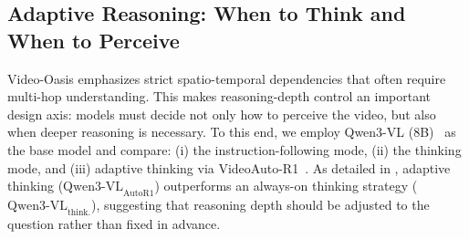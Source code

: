 \documentclass[runningheads]{llncs}
\begin{document}
{    \vspace{-4mm}

    \subsection{Adaptive Reasoning: When to Think and When to Perceive}
    \label{sec:5.2}
        Video-Oasis emphasizes strict spatio-temporal dependencies that often require multi-hop understanding.
        This makes reasoning-depth control an important design axis: models must decide not only how to perceive the video, but also when deeper reasoning is necessary.
        To this end, we employ Qwen3-VL (8B)~\cite{qwem3_vl} as the base model and compare: (i) the instruction-following mode, (ii) the thinking mode, and (iii) adaptive thinking via VideoAuto-R1~\cite{videoautor1}.
        As detailed in , adaptive thinking ($\text{Qwen3-VL}_\text{AutoR1}$) outperforms an always-on thinking strategy ($\text{Qwen3-VL}_\text{think.}$), suggesting that reasoning depth should be adjusted to the question rather than fixed in advance.
        
        \begin{table}[ht]
            \vspace{-4mm}
            \centering
            \caption{Ablation study of reasoning depth modulation. The metric is accuracy.}
            \label{tab:main10}
            \setlength{\tabcolsep}{4pt}
            \vspace{-4mm}
        \end{table}

}
\end{document}
